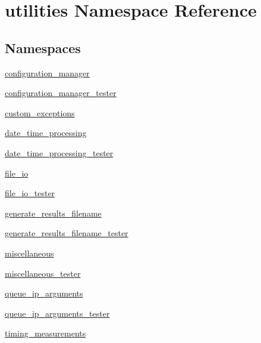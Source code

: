 \hypertarget{namespaceutilities}{}\section{utilities Namespace Reference}
\label{namespaceutilities}
\subsection*{Namespaces}
\begin{DoxyCompactItemize}
\item 
 \hyperlink{namespaceutilities_1_1configuration__manager}{configuration\+\_\+manager}
\item 
 \hyperlink{namespaceutilities_1_1configuration__manager__tester}{configuration\+\_\+manager\+\_\+tester}
\item 
 \hyperlink{namespaceutilities_1_1custom__exceptions}{custom\+\_\+exceptions}
\item 
 \hyperlink{namespaceutilities_1_1date__time__processing}{date\+\_\+time\+\_\+processing}
\item 
 \hyperlink{namespaceutilities_1_1date__time__processing__tester}{date\+\_\+time\+\_\+processing\+\_\+tester}
\item 
 \hyperlink{namespaceutilities_1_1file__io}{file\+\_\+io}
\item 
 \hyperlink{namespaceutilities_1_1file__io__tester}{file\+\_\+io\+\_\+tester}
\item 
 \hyperlink{namespaceutilities_1_1generate__results__filename}{generate\+\_\+results\+\_\+filename}
\item 
 \hyperlink{namespaceutilities_1_1generate__results__filename__tester}{generate\+\_\+results\+\_\+filename\+\_\+tester}
\item 
 \hyperlink{namespaceutilities_1_1miscellaneous}{miscellaneous}
\item 
 \hyperlink{namespaceutilities_1_1miscellaneous__tester}{miscellaneous\+\_\+tester}
\item 
 \hyperlink{namespaceutilities_1_1queue__ip__arguments}{queue\+\_\+ip\+\_\+arguments}
\item 
 \hyperlink{namespaceutilities_1_1queue__ip__arguments__tester}{queue\+\_\+ip\+\_\+arguments\+\_\+tester}
\item 
 \hyperlink{namespaceutilities_1_1timing__measurements}{timing\+\_\+measurements}
\end{DoxyCompactItemize}
